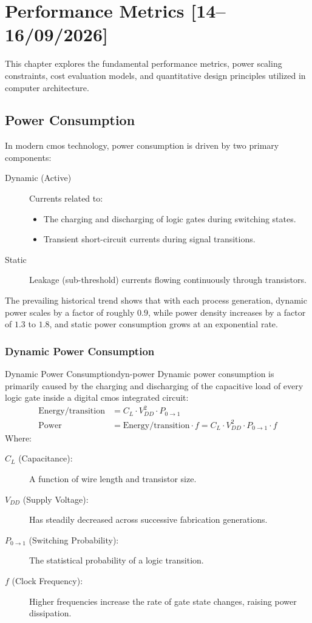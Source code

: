 \chapter{Performance Metrics [14--16/09/2026]} 
This chapter explores the fundamental performance metrics, power scaling constraints, cost evaluation models, and quantitative design principles utilized in computer architecture.

\section{Power Consumption}
In modern \gls{cmos} technology, power consumption is driven by two primary components:
\begin{description}
    \item[Dynamic (Active)] Currents related to:
    \begin{itemize}
        \item The charging and discharging of logic gates during switching states.
        \item Transient short-circuit currents during signal transitions.
    \end{itemize}
    \item[Static] Leakage (sub-threshold) currents flowing continuously through transistors.
\end{description}
\noindent The prevailing historical trend shows that with each process generation, dynamic power scales by a factor of roughly $0.9$, while power density increases by a factor of $1.3$ to $1.8$, and static power consumption grows at an exponential rate.

\subsection{Dynamic Power Consumption}
\begin{definition}{Dynamic Power Consumption}{dyn-power}
    Dynamic power consumption is primarily caused by the charging and discharging of the capacitive load of every logic gate inside a digital \gls{cmos} integrated circuit:
    \begin{align*}
        \text{Energy/transition} &= C_L \cdot V_{DD}^2 \cdot P_{0\rightarrow1} \\
        \text{Power} &= \text{Energy/transition} \cdot f = C_{L} \cdot V_{DD}^2 \cdot P_{0\rightarrow1} \cdot f
    \end{align*} 
    Where:
    \begin{description}
        \item[\(C_L\) (Capacitance):] A function of wire length and transistor size.
        \item[\(V_{DD}\) (Supply Voltage):] Has steadily decreased across successive fabrication generations.
        \item[\(P_{0\rightarrow1}\) (Switching Probability):] The statistical probability of a logic transition.
        \item[\(f\) (Clock Frequency):] Higher frequencies increase the rate of gate state changes, raising power dissipation.
    \end{description}
\end{definition}


